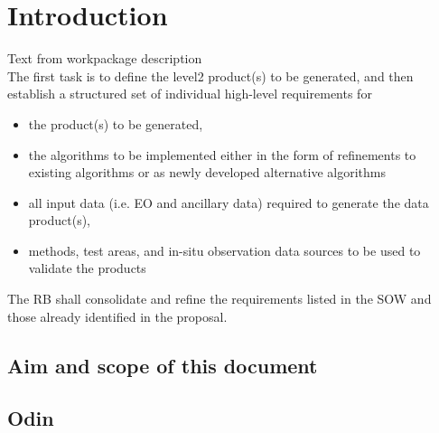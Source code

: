 \chapter{Introduction}
\label{chapter:introduction}

Text from workpackage description\\
The first task is to define the level2 product(s) to be generated,
and then establish a structured set of individual high-level requirements for
\begin{itemize}
\item the product(s) to be generated,
\item the algorithms to be implemented either in the form of refinements to existing
  algorithms or as newly developed alternative algorithms
\item all input data (i.e. EO and ancillary data) required to generate the data product(s),
\item methods, test areas, and in-situ observation data sources to be used to validate the products
\end{itemize}

The RB shall consolidate and refine the requirements listed in the SOW
and those already identified in the proposal.

\setcounter{page}{1}


\section{Aim and scope of this document}
\label{sec:aim}


\section{Odin}



